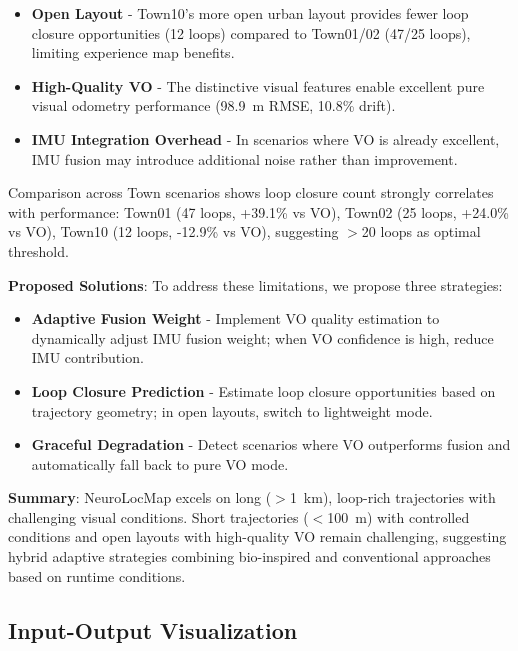 \begin{itemize}
    \item \textbf{Open Layout} - Town10's more open urban layout provides fewer loop closure op\-por\-tu\-ni\-ties (12 loops) compared to Town01/02 (47/25 loops), limiting experience map benefits.

    \item \textbf{High-Quality VO} - The distinctive visual features enable excellent pure visual odometry per\-for\-mance (98.9~m RMSE, 10.8\% drift).

    \item \textbf{IMU Integration Overhead} - In scenarios where VO is already excellent, IMU fusion may introduce additional noise rather than improvement.
\end{itemize}

Comparison across Town scenarios shows loop closure count strongly correlates with per\-for\-mance: Town01 (47 loops, +39.1\% vs VO), Town02 (25 loops, +24.0\% vs VO), Town10 (12 loops, -12.9\% vs VO), suggesting $>$20 loops as optimal threshold.

\textbf{Proposed Solutions}: To address these limitations, we propose three strategies:

\begin{itemize}
    \item \textbf{Adaptive Fusion Weight} - Implement VO quality estimation to dynamically adjust IMU fusion weight; when VO confidence is high, reduce IMU con\-tri\-bu\-tion.

    \item \textbf{Loop Closure Prediction} - Estimate loop closure op\-por\-tu\-ni\-ties based on trajectory geometry; in open layouts, switch to lightweight mode.

    \item \textbf{Graceful Degradation} - Detect scenarios where VO outperforms fusion and automatically fall back to pure VO mode.
\end{itemize}

\textbf{Summary}: NeuroLocMap excels on long ($>$1~km), loop-rich trajectories with challenging visual conditions. Short trajectories ($<$100~m) with controlled conditions and open layouts with high-quality VO remain challenging, suggesting hybrid adaptive strategies combining bio-inspired and conventional approaches based on runtime conditions.

\subsection{Input-Output Visualization}

